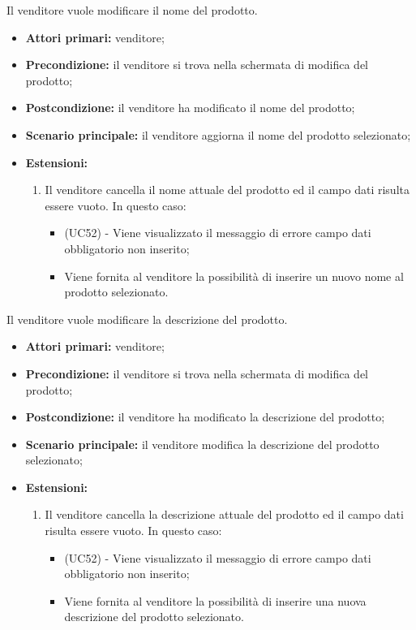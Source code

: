 \resetSubUC
{}
Il venditore vuole modificare il nome del prodotto.
\begin{itemize}
    \item \textbf{Attori primari:} venditore;
    \item \textbf{Precondizione:} il venditore si trova nella schermata di modifica del prodotto;
    \item \textbf{Postcondizione:} il venditore ha modificato il nome del prodotto;
    \item \textbf{Scenario principale:} il venditore aggiorna il nome del prodotto selezionato;
    \item \textbf{Estensioni:}
    \begin{enumerate}[label=\lett]
    	\item Il venditore cancella il nome attuale del prodotto ed il campo dati risulta essere vuoto. In questo caso:
    	\begin{itemize}
    		\item (UC52) - Viene visualizzato il messaggio di errore campo dati obbligatorio non inserito;
    		\item Viene fornita al venditore la possibilità di inserire un nuovo nome al prodotto selezionato.
    	\end{itemize}
    \end{enumerate}
\end{itemize}

Il venditore vuole modificare la descrizione del prodotto.
\begin{itemize}
    \item \textbf{Attori primari:} venditore;
    \item \textbf{Precondizione:} il venditore si trova nella schermata di modifica del prodotto;
    \item \textbf{Postcondizione:} il venditore ha modificato la descrizione del prodotto;
    \item \textbf{Scenario principale:} il venditore modifica la descrizione del prodotto selezionato;
    \item \textbf{Estensioni:}
    \begin{enumerate}[label=\lett]
    	\item Il venditore cancella la descrizione attuale del prodotto ed il campo dati risulta essere vuoto. In questo caso:
    	\begin{itemize}
    		\item (UC52) - Viene visualizzato il messaggio di errore campo dati obbligatorio non inserito;
    		\item Viene fornita al venditore la possibilità di inserire una nuova descrizione del prodotto selezionato.
    	\end{itemize}
    \end{enumerate}
\end{itemize}

